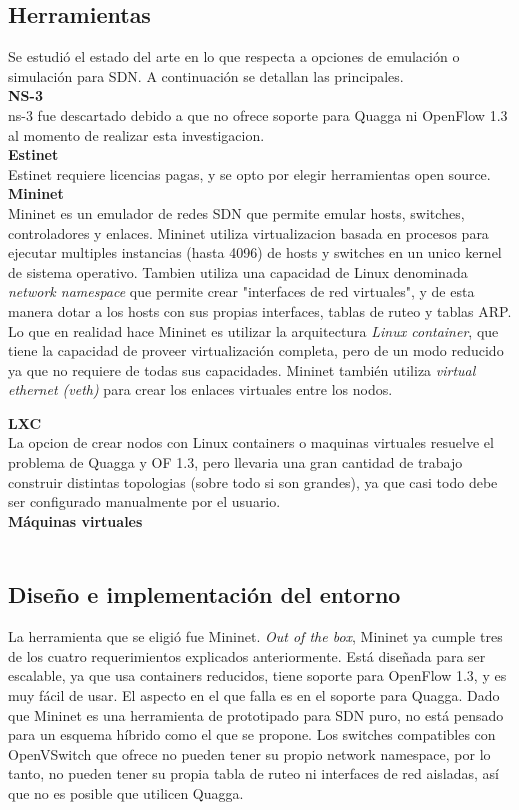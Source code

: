 \documentclass[a4paper,12pt]{report}
\begin{document}
\subsection{Herramientas}
Se estudió el estado del arte en lo que respecta a opciones de emulación o simulación para SDN. A continuación se detallan las principales.\\

\textbf{NS-3}\\
ns-3 fue descartado debido a que no ofrece soporte para Quagga ni OpenFlow 1.3 al momento de realizar esta investigacion.\\

\textbf{Estinet}\\
Estinet requiere licencias pagas, y se opto por elegir herramientas open source.\\

\textbf{Mininet}\\
Mininet es un emulador de redes SDN que permite emular hosts, switches, controladores y enlaces. Mininet utiliza virtualizacion basada en procesos para ejecutar multiples instancias (hasta 4096) de hosts y switches en un unico kernel de sistema operativo. Tambien utiliza una capacidad de Linux denominada \textit{network namespace} que permite crear "interfaces de red virtuales", y de esta manera dotar a los hosts con sus propias interfaces, tablas de ruteo y tablas ARP. Lo que en realidad hace Mininet es utilizar la arquitectura \textit{Linux container}, que tiene la capacidad de proveer virtualización completa, pero de un modo reducido ya que no requiere de todas sus capacidades. Mininet también utiliza \textit{virtual ethernet (veth)} para crear los enlaces virtuales entre los nodos.


\textbf{LXC}\\
La opcion de crear nodos con Linux containers o maquinas virtuales resuelve el problema de Quagga y OF 1.3, pero llevaria una gran cantidad de trabajo construir distintas topologias (sobre todo si son grandes), ya que casi todo debe ser configurado manualmente por el usuario.\\


\textbf{Máquinas virtuales}\\
\\

\subsection{Diseño e implementación del entorno}
La herramienta que se eligió fue Mininet. \textit{Out of the box}, Mininet ya cumple tres de los cuatro requerimientos explicados anteriormente. Está diseñada para ser escalable, ya que usa containers reducidos, tiene soporte para OpenFlow 1.3, y es muy fácil de usar. El aspecto en el que falla es en el soporte para Quagga. Dado que Mininet es una herramienta de prototipado para SDN puro, no está pensado para un esquema híbrido como el que se propone. Los switches compatibles con OpenVSwitch que ofrece no pueden tener su propio network namespace, por lo tanto, no pueden tener su propia tabla de ruteo ni interfaces de red aisladas, así que no es posible que utilicen Quagga.
\end{document}
